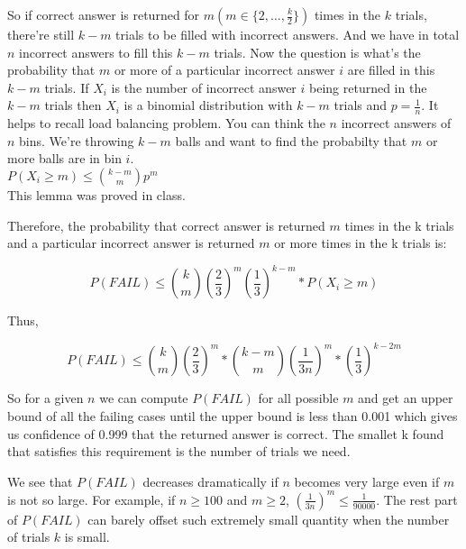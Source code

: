 \documentclass[11pt]{article}
\begin{document}
\noindent So if correct answer is returned for $m(m \in \{2, \dots, \frac{k}{2}\})$ times in the $k$ trials, there're still $k-m$ trials to be filled with incorrect answers. 
And we have in total $n$ incorrect answers to fill this $k-m$ trials.
Now the question is what's the probability that $m$ or more of a particular incorrect answer $i$ are filled in this $k-m$ trials.
If $X_i$ is the number of incorrect answer $i$ being returned in the $k-m$ trials then $X_i$ is a binomial distribution with $k-m$ trials and $p = \frac{1}{n}$.
It helps to recall load balancing problem.
You can think the $n$ incorrect answers of $n$ bins.
We're throwing $k-m$ balls and want to find the probabilty that $m$ or more balls are in bin $i$.
\\

 $P(X_i \ge m) \le {k-m \choose m} p^m$
\\

\noindent This lemma was proved in class.

\noindent Therefore, the probability that correct answer is returned $m$ times in the k trials and a particular incorrect answer is returned $m$ or more times in the k trials is:

\begin{equation*}
	P(FAIL) \le {k \choose m} \left(\frac{2}{3}\right) ^ m \left(\frac{1}{3}\right) ^ {k-m} * P(X_i \ge m)
\end{equation*}

\noindent Thus,

\begin{equation*}
	P(FAIL) \le {k \choose m} \left(\frac{2}{3}\right) ^ m * {k-m \choose m} \left(\frac{1}{3n}\right) ^ {m} * \left(\frac{1}{3}\right) ^ {k-2m}
\end{equation*}

\noindent So for a given $n$ we can compute $P(FAIL)$ for all possible $m$ and get an upper bound of all the failing cases until the upper bound is less than 0.001 which gives us confidence of 0.999 that the returned answer is correct.
The smallet k found that satisfies this requirement is the number of trials we need.
\newline


\noindent We see that $P(FAIL)$ decreases dramatically if $n$ becomes very large even if $m$ is not so large. 
For example, if $n \ge 100$ and $m \ge 2$, $\left(\frac{1}{3n}\right) ^ m \le \frac{1}{90000}$. The rest part of $P(FAIL)$ can barely offset such extremely small quantity when the number of trials $k$ is small.
\end{document}
